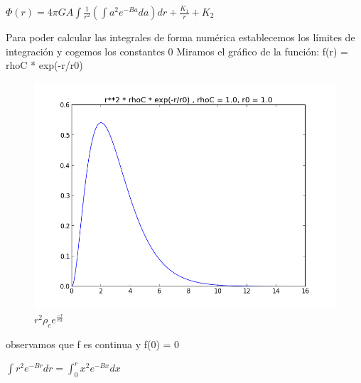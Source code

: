 \documentclass[12pt]{book}
\begin{document}
\begin{description}
\item $\Phi(r) = 4 \pi G A \int{ \frac{1}{r^2}(\int{a^2 e^{-Ba}da})dr} + \frac{K_1}{r} + K_2$



\item Para poder calcular las integrales de forma numérica establecemos los límites de integración y cogemos los constantes 0
Miramos el gráfico de la función: f(r) = rhoC * exp(-r/r0)
\begin{figure}[!ht]
 \centering
 \includegraphics[scale=0.33]{func1Plot.png}
 \caption{\emph{$r^2  \rho_c  e^{\frac{-r}{r0}}$}}
\end{figure}
observamos que  f es  continua y f(0) = 0
\item  $\int{r^2 e^{-Br}dr} = \int_0^r{x^2 e^{-Bx}dx}$



\end{description}
\end{document}
